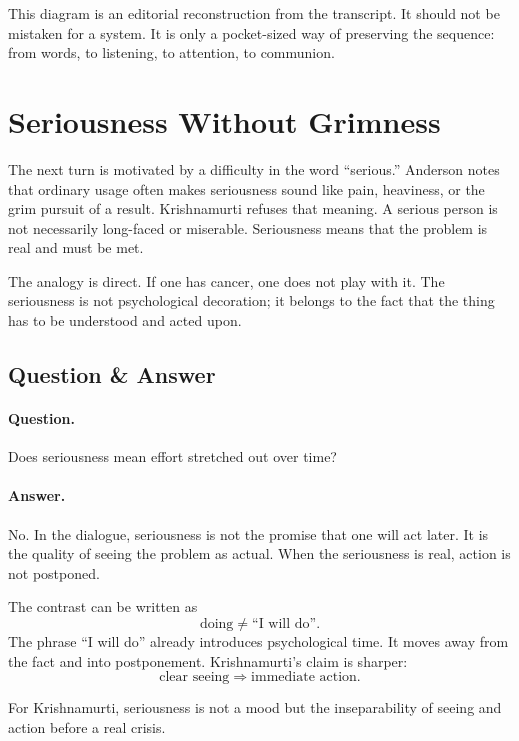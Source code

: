 This diagram is an editorial reconstruction from the transcript. It should not be mistaken for a system. It is only a pocket-sized way of preserving the sequence: from words, to listening, to attention, to communion.

\section{Seriousness Without Grimness}

The next turn is motivated by a difficulty in the word ``serious.'' Anderson notes that ordinary usage often makes seriousness sound like pain, heaviness, or the grim pursuit of a result. Krishnamurti refuses that meaning. A serious person is not necessarily long-faced or miserable. Seriousness means that the problem is real and must be met.

The analogy is direct. If one has cancer, one does not play with it. The seriousness is not psychological decoration; it belongs to the fact that the thing has to be understood and acted upon.

\subsection{Question \& Answer}

\paragraph{Question.}
Does seriousness mean effort stretched out over time?

\paragraph{Answer.}
No. In the dialogue, seriousness is not the promise that one will act later. It is the quality of seeing the problem as actual. When the seriousness is real, action is not postponed.

The contrast can be written as
\begin{equation}
\text{doing} \neq \text{``I will do''}.
\end{equation}
The phrase ``I will do'' already introduces psychological time. It moves away from the fact and into postponement. Krishnamurti's claim is sharper:
\begin{equation}
\text{clear seeing}
\Longrightarrow
\text{immediate action}.
\end{equation}

\begin{proposition}
For Krishnamurti, seriousness is not a mood but the inseparability of seeing and action before a real crisis.
\end{proposition}

